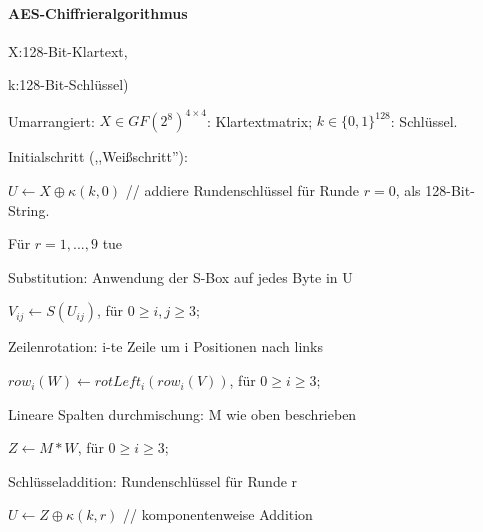 \documentclass[a4paper]{article}
\begin{document}
\begin{multicols}{3}
    \paragraph{AES-Chiffrieralgorithmus}
    \begin{itemize*}
        \item X:128-Bit-Klartext,
        \item k:128-Bit-Schlüssel)
        \item Umarrangiert: $X\in GF(2^8)^{4\times 4}$: Klartextmatrix; $k\in\{0,1\}^{128}$: Schlüssel.
        \begin{enumerate*}
            \item Initialschritt (,,Weißschritt''):
            \begin{itemize*}
                \item $U\leftarrow X\oplus \kappa (k,0)$ // addiere Rundenschlüssel für Runde $r=0$, als 128-Bit-String.
            \end{itemize*}
            \item  Für $r=1,...,9$ tue
            \begin{enumerate*}
                \item Substitution: Anwendung der S-Box auf jedes Byte in U
                \begin{itemize*}
                    \item $V_{ij}\leftarrow S(U_{ij})$, für $0\geq i,j\geq 3$;
                \end{itemize*}
                \item  Zeilenrotation: i-te Zeile um i Positionen nach links
                \begin{itemize*}
                    \item $row_i(W)\leftarrow rotLeft_i(row_i(V))$, für $0\geq i\geq 3$;
                \end{itemize*}
                \item  Lineare Spalten durchmischung: M wie oben beschrieben
                \begin{itemize*}
                    \item $Z\leftarrow M*W$, für $0\geq i\geq 3$;
                \end{itemize*}
                \item  Schlüsseladdition: Rundenschlüssel für Runde r
                \begin{itemize*}
                    \item $U\leftarrow Z\oplus \kappa (k,r)$ // komponentenweise Addition

\end{itemize*}
\end{enumerate*}
\end{enumerate*}
\end{itemize*}
\end{multicols}
\end{document}
